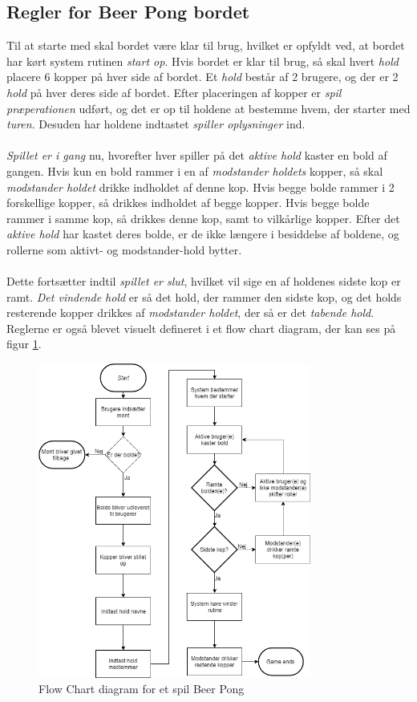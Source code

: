 \documentclass[Rapport/Rapport_main.tex]{subfiles}
\begin{document}
\subsection{Regler for Beer Pong bordet}
Til at starte med skal bordet være klar til brug, hvilket er opfyldt ved, at bordet har kørt system rutinen \textit{start op}. Hvis bordet er klar til brug, så skal hvert \textit{hold} placere 6 kopper på hver side af bordet. Et \textit{hold} består af 2 brugere, og der er 2 \textit{hold} på hver deres side af bordet. Efter placeringen af kopper er \textit{spil præperationen} udført, og det er op til holdene at bestemme hvem, der starter med \textit{turen}. Desuden har holdene indtastet \textit{spiller oplysninger} ind. \\\\
\textit{Spillet er i gang} nu, hvorefter hver spiller på det \textit{aktive hold} kaster en bold af gangen. Hvis kun en bold rammer i en af \textit{modstander holdets} kopper, så skal \textit{modstander holdet} drikke indholdet af denne kop. Hvis begge bolde rammer i 2 forskellige kopper, så drikkes indholdet af begge kopper. Hvis begge bolde rammer i samme kop, så drikkes denne kop, samt to vilkårlige kopper. Efter det \textit{aktive hold} har kastet deres bolde, er de ikke længere i besiddelse af boldene, og rollerne som aktivt- og modstander-hold bytter.\\\\
Dette fortsætter indtil \textit{spillet er slut}, hvilket vil sige en af holdenes sidste kop er ramt. \textit{Det vindende hold} er så det hold, der rammer den sidste kop, og det holds resterende kopper drikkes af\textit{ modstander holdet}, der så er det \textit{tabende hold}. Reglerne er også blevet visuelt defineret i et flow chart diagram, der kan ses på figur \ref{fig:rap_beer_pong_flow}.
\begin{figure}[H]
    \centering
    \includegraphics[width=0.8\textwidth]{Kravspecifikation/Flowchart/pics/Beerpongflowchart.png}
    \caption{Flow Chart diagram for et spil Beer Pong}
    \label{fig:rap_beer_pong_flow}
\end{figure}
\end{document}

